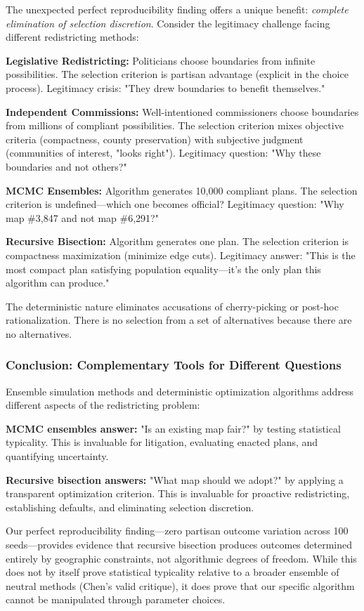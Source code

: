 The unexpected perfect reproducibility finding offers a unique benefit: \textit{complete elimination of selection discretion}. Consider the legitimacy challenge facing different redistricting methods:

\textbf{Legislative Redistricting:} Politicians choose boundaries from infinite possibilities. The selection criterion is partisan advantage (explicit in the choice process). Legitimacy crisis: "They drew boundaries to benefit themselves."

\textbf{Independent Commissions:} Well-intentioned commissioners choose boundaries from millions of compliant possibilities. The selection criterion mixes objective criteria (compactness, county preservation) with subjective judgment (communities of interest, "looks right"). Legitimacy question: "Why these boundaries and not others?"

\textbf{MCMC Ensembles:} Algorithm generates 10,000 compliant plans. The selection criterion is undefined—which one becomes official? Legitimacy question: "Why map \#3,847 and not map \#6,291?"

\textbf{Recursive Bisection:} Algorithm generates one plan. The selection criterion is compactness maximization (minimize edge cuts). Legitimacy answer: "This is the most compact plan satisfying population equality—it's the only plan this algorithm can produce."

The deterministic nature eliminates accusations of cherry-picking or post-hoc rationalization. There is no selection from a set of alternatives because there are no alternatives.

\subsubsection{Conclusion: Complementary Tools for Different Questions}

Ensemble simulation methods and deterministic optimization algorithms address different aspects of the redistricting problem:

\textbf{MCMC ensembles answer:} "Is an existing map fair?" by testing statistical typicality. This is invaluable for litigation, evaluating enacted plans, and quantifying uncertainty.

\textbf{Recursive bisection answers:} "What map should we adopt?" by applying a transparent optimization criterion. This is invaluable for proactive redistricting, establishing defaults, and eliminating selection discretion.

Our perfect reproducibility finding—zero partisan outcome variation across 100 seeds—provides evidence that recursive bisection produces outcomes determined entirely by geographic constraints, not algorithmic degrees of freedom. While this does not by itself prove statistical typicality relative to a broader ensemble of neutral methods (Chen's valid critique), it does prove that our specific algorithm cannot be manipulated through parameter choices.

